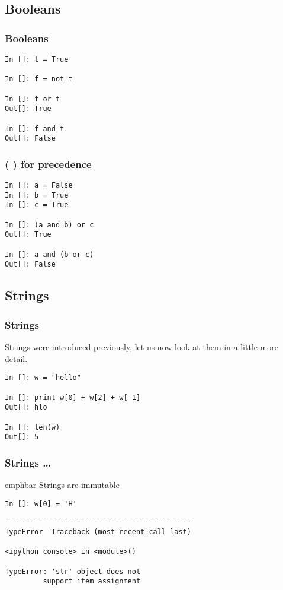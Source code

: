 \documentclass[14pt,compress]{beamer}
\newcommand{\emphbar}[1]
{\begin{beamercolorbox}[rounded=true]{emphbar} 
      {#1}
 \end{beamercolorbox}
}
\newcounter{time}
\newcommand{\inctime}[1]{\addtocounter{time}{#1}{\tiny \thetime\ m}}
\begin{document}
\subsection{Booleans}
\begin{frame}[fragile]
  \frametitle{Booleans}
  \begin{lstlisting}
In []: t = True

In []: f = not t

In []: f or t
Out[]: True

In []: f and t
Out[]: False
  \end{lstlisting}
  \inctime{5}
\end{frame}

\begin{frame}[fragile]
  \frametitle{( )  for precedence}
  \begin{lstlisting}
In []: a = False
In []: b = True
In []: c = True

In []: (a and b) or c
Out[]: True

In []: a and (b or c)
Out[]: False
  \end{lstlisting}
  \inctime{5}
\end{frame}

\subsection{Strings}

\begin{frame}[fragile]
  \frametitle{Strings}
Strings were introduced previously, let us now look at them in a little more detail.
  \begin{lstlisting}
In []: w = "hello"

In []: print w[0] + w[2] + w[-1]
Out[]: hlo

In []: len(w)
Out[]: 5
  \end{lstlisting}
\end{frame}

\begin{frame}[fragile]
  \frametitle{Strings \ldots}
  \emphbar{Strings are immutable}
  \begin{lstlisting}
In []: w[0] = 'H' 
  \end{lstlisting}
  \pause
  \begin{lstlisting}
--------------------------------------------
TypeError  Traceback (most recent call last)

<ipython console> in <module>()

TypeError: 'str' object does not
         support item assignment
  \end{lstlisting}
\end{frame}
\end{document}
